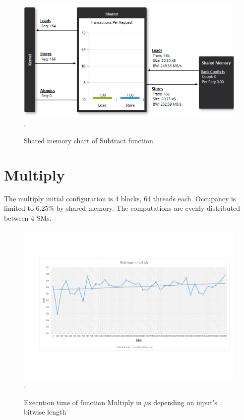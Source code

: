 \documentclass[oneside,openright,12pt,final,en]{mgr}
\begin{document}
\begin{figure}[H]
	\centering
	\includegraphics[width=\textwidth]{subtract_shared}.
	\caption{Shared memory chart of Subtract function}
	\label{fig:subtract_shared}
\end{figure}

\section{Multiply}

The multiply initial configuration is 4 blocks, 64 threads each. Occupancy is limited to 6.25\% by shared memory. The computations are evenly distributed between 4 SMs. 

\begin{figure}[H]
	\centering
	\includegraphics[width=\textwidth,trim={0.5cm 2.8cm 0.4cm 2.8cm},clip]{multiply.pdf}.
	\caption{Execution time of function Multiply in $\mu$s depending on input's bitwise length}
	\label{fig:multiply}
\end{figure}
\end{document}
